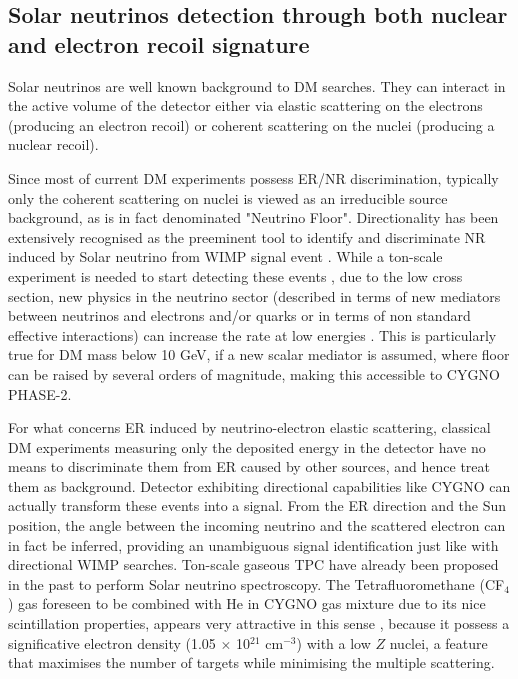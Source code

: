 \documentclass[physics,article,submit,moreauthors,pdftex]{Definitions/mdpi}
\begin{document}
\subsection{Solar neutrinos detection through both nuclear and electron recoil signature}
Solar neutrinos are well known background to DM searches. They can interact in the active volume of the detector either via elastic scattering on the electrons (producing an electron recoil) or coherent scattering on the nuclei (producing a nuclear recoil). 

Since most of current DM experiments possess ER/NR discrimination, typically only the coherent scattering on nuclei is viewed as an irreducible source background, as is in fact denominated "Neutrino Floor". Directionality has been extensively recognised as the preeminent tool to identify and discriminate NR induced by Solar neutrino from WIMP signal event \cite{Mayet:2016zxu,Vahsen:2020pzb, Billard:2013qya}. While a ton-scale experiment is needed to start detecting these events \cite{Vahsen:2020pzb}, due to the low cross section, new physics in the neutrino sector (described in terms of new mediators between neutrinos and electrons and/or quarks or in terms of non standard effective interactions) can increase the rate at low energies \cite{Boehm:2018sux}. This is particularly true for DM mass below 10 GeV, if a new scalar mediator is assumed, where floor can be raised by several orders of magnitude, making this accessible to CYGNO PHASE-2. 

For what concerns ER induced by neutrino-electron elastic scattering, classical DM experiments measuring only the deposited energy in the detector have no means to discriminate them from ER caused by other sources, and hence treat them as background. Detector exhibiting directional capabilities like CYGNO can actually transform these events into a signal. From the ER direction and the Sun position, the angle between the incoming neutrino and the scattered electron can in fact be inferred, providing an unambiguous signal identification just like with directional WIMP searches. Ton-scale gaseous TPC have already been proposed in the past \cite{Seguinot:1992zu,Arpesella:1996uc} to perform Solar neutrino spectroscopy. The Tetrafluoromethane (CF$_4$) gas foreseen to be combined with He in CYGNO gas mixture due to its nice scintillation properties, appears very attractive in this sense \cite{Arpesella:1996uc}, because it possess a significative electron density (1.05 $\times$ 10$^{21}$ cm$^{-3}$) with a low $Z$ nuclei, a feature that maximises the number of targets while minimising the multiple scattering. 
\end{document}
